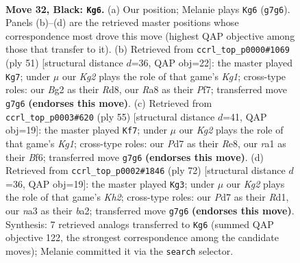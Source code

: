 \documentclass[11pt]{article}
\begin{document}
\clearpage

\begin{figure}[p]\centering
\begin{subfigure}{0.46\textwidth}\centering
\resizebox{\linewidth}{!}{%
\newchessgame
\chessboard[
  setfen={r7/p1pp2k1/1p3n2/5p1p/2P2P2/NP6/P1BPK1bP/R7 b - - 3 32},
  showmover=false,
  pgfstyle=straightmove, color=movearrow, markmove={g7-g6}
]}
\caption{}
\end{subfigure}\hfill
\begin{subfigure}{0.46\textwidth}\centering
\resizebox{\linewidth}{!}{%
\newchessgame
\chessboard[
  setfen={3r2k1/1p3p1p/2b3p1/p1n5/2P3P1/5PR1/PP5P/2K1NB2 b - - 1 26},
  showmover=false,
  pgfstyle=straightmove, color=movearrow, markmove={g8-g7}
]}
\caption{}
\end{subfigure}
\\[4pt]
\begin{subfigure}{0.46\textwidth}\centering
\resizebox{\linewidth}{!}{%
\newchessgame
\chessboard[
  setfen={4r1k1/pp6/5bp1/n1N1pp2/P1P5/2P5/1P4PP/2BR2K1 b - - 2 28},
  showmover=false,
  pgfstyle=straightmove, color=movearrow, markmove={g8-f7}
]}
\caption{}
\end{subfigure}\hfill
\begin{subfigure}{0.46\textwidth}\centering
\resizebox{\linewidth}{!}{%
\newchessgame
\chessboard[
  setfen={6k1/6p1/p3np2/7p/P3PP2/2rpB2P/b2N2PK/3R4 w - - 1 37},
  showmover=false,
  pgfstyle=straightmove, color=movearrow, markmove={h2-g3}
]}
\caption{}
\end{subfigure}
\caption{\textbf{Move 32, Black: \texttt{Kg6}.} (a) Our position; Melanie plays \texttt{Kg6} (\texttt{g7g6}). Panels (b)--(d) are the retrieved master positions whose correspondence most drove this move (highest QAP objective among those that transfer to it). (b) Retrieved from \texttt{ccrl\_top\_p0000\#1069} (ply 51) [structural distance $d$=36, QAP obj=22]: the master played \texttt{Kg7}; under $\mu$ our \emph{Kg2} plays the role of that game's \emph{Kg1}; cross-type roles: our \emph{B}g2 as their \emph{R}d8, our \emph{R}a8 as their \emph{P}f7; transferred move \texttt{g7g6} \textbf{(endorses this move)}. (c) Retrieved from \texttt{ccrl\_top\_p0003\#620} (ply 55) [structural distance $d$=41, QAP obj=19]: the master played \texttt{Kf7}; under $\mu$ our \emph{Kg2} plays the role of that game's \emph{Kg1}; cross-type roles: our \emph{P}d7 as their \emph{R}e8, our \emph{r}a1 as their \emph{B}f6; transferred move \texttt{g7g6} \textbf{(endorses this move)}. (d) Retrieved from \texttt{ccrl\_top\_p0002\#1846} (ply 72) [structural distance $d$=36, QAP obj=19]: the master played \texttt{Kg3}; under $\mu$ our \emph{Kg2} plays the role of that game's \emph{Kh2}; cross-type roles: our \emph{P}d7 as their \emph{R}d1, our \emph{n}a3 as their \emph{b}a2; transferred move \texttt{g7g6} \textbf{(endorses this move)}. Synthesis: 7 retrieved analogs transferred to \texttt{Kg6} (summed QAP objective 122, the strongest correspondence among the candidate moves); Melanie committed it via the \texttt{search} selector.}
\label{fig:thought-m63}
\end{figure}
\end{document}
